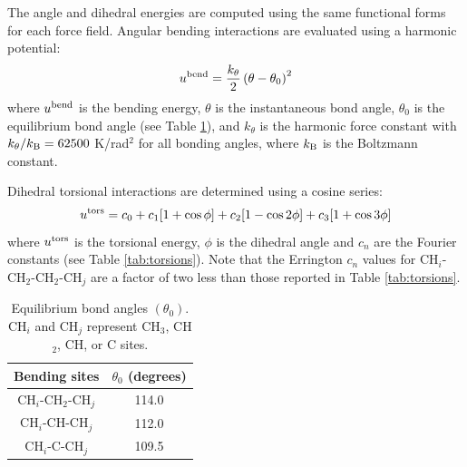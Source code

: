 \documentclass[preprint,letterpaper,floatfix,citeautoscript,aip,jcp]{revtex4-1}
\begin{document}
The angle and dihedral energies are computed using the same functional forms for each force field. Angular bending interactions are evaluated using a harmonic potential:
\begin{equation}
u^{\rm bend} = \frac{k_\theta}{2} \left(\theta-\theta_0\right)^2
\end{equation}
where $u^{\rm bend}$ is the bending energy, $\theta$ is the instantaneous bond angle, $\theta_0$ is the equilibrium bond angle (see Table \ref{tab:angles}), and $k_\theta$ is the harmonic force constant with $k_\theta/k_{\rm B} = 62500$ K/rad$^2$ for all bonding angles, where $k_{\rm B}$ is the Boltzmann constant. 

Dihedral torsional interactions are determined using a cosine series:
\begin{equation}
u^{\rm tors} = c_0 + c_1 [1+\cos{\phi}] + c_2 [1-\cos{2\phi}] + c_3 [1+\cos{3\phi}]
\end{equation}
where $u^{\rm tors}$ is the torsional energy, $\phi$ is the dihedral angle and $c_n$ are the Fourier constants (see Table \ref{tab:torsions}). Note that the Errington $c_n$ values for CH$_i$-CH$_2$-CH$_2$-CH$_j$ are a factor of two less than those reported in Table \ref{tab:torsions}. \cite{Exp6}
\begin{table}[h!]
	\caption{Equilibrium bond angles $(\theta_0)$.\cite{Martin1999} CH$_i$ and CH$_j$ represent CH$_3$, CH$_2$, CH, or C sites.} \label{tab:angles}
	\begin{center}%
		\begin{tabular}{|c|c|}
			\hline
			Bending sites & $\theta_0$ (degrees) \\ \hline
			CH$_i$-CH$_2$-CH$_j$ & 114.0 \\ 
			CH$_i$-CH-CH$_j$ & 112.0 \\ 
			CH$_i$-C-CH$_j$ & 109.5 \\  
			\hline
		\end{tabular}
	\end{center} 
\end{table}
\end{document}
